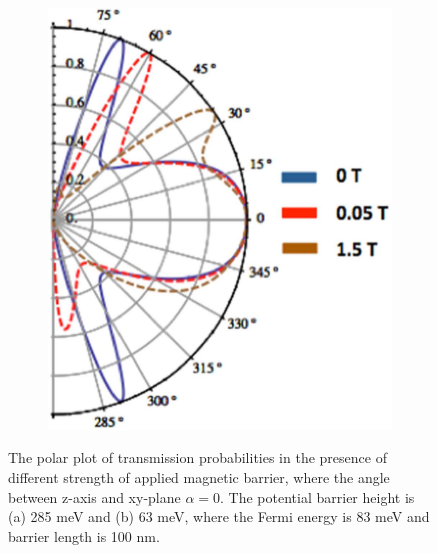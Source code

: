 \begin{figure}[H]
\begin{subfigure}[b]{0.4\linewidth}
                \includegraphics[width = \linewidth]{fig/Chap 2/klein b field 2.png}
                \caption{}
                \label{2fig:klein b field 2}
            \end{subfigure}
        \caption{The polar plot of transmission probabilities in the presence of different strength of applied magnetic barrier, 
                    where the angle between z-axis and xy-plane $\alpha = 0$. 
                    The potential barrier height is (a) 285 meV and (b) 63 meV, where the Fermi energy is 83 meV and barrier length is 100 nm.}
        \label{2fig:klein b field}    
    \end{figure}
